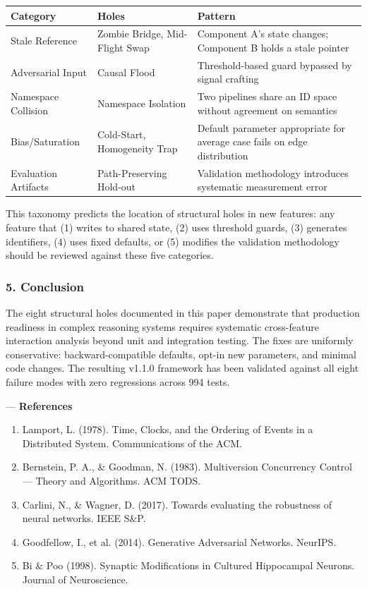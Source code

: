 \begin{center}
{\footnotesize
\begin{tabularx}{\columnwidth}{|>{\raggedright\arraybackslash}X|>{\raggedright\arraybackslash}X|>{\raggedright\arraybackslash}X|}
\hline
Category & Holes & Pattern \\ \hline
Stale Reference & Zombie Bridge, Mid-Flight Swap & Component A's state changes; Component B holds a stale pointer \\ \hline
Adversarial Input & Causal Flood & Threshold-based guard bypassed by signal crafting \\ \hline
Namespace Collision & Namespace Isolation & Two pipelines share an ID space without agreement on semantics \\ \hline
Bias/Saturation & Cold-Start, Homogeneity Trap & Default parameter appropriate for average case fails on edge distr\-ibution \\ \hline
Evaluation Artifacts & Path-Preserving Hold-out & Validation methodology introduces systematic measurement error \\ \hline
\end{tabularx}
}
\end{center}

This taxonomy predicts the location of structural holes in new features: any feature that (1) writes to shared state, (2) uses threshold guards, (3) generates identifiers, (4) uses fixed defaults, or (5) modifies the validation methodology should be reviewed against these five categories.

\subsubsection{5. Conclusion}
The eight structural holes documented in this paper demonstrate that production readiness in complex reasoning systems requires systematic cross-feature interaction analysis beyond unit and integration testing. The fixes are uniformly conse\-rvative: backward-compatible defaults, opt-in new parameters, and minimal code changes. The resulting v1.1.0 framework has been validated against all eight failure modes with zero regressions across 994 tests.

---
\textbf{References}
\begin{enumerate}
\item Lamport, L. (1978). Time, Clocks, and the Ordering of Events in a Distributed System. Commun\-ications of the ACM.
\item Bernstein, P. A., \& Goodman, N. (1983). Multiv\-ersion Concurrency Control — Theory and Algorithms. ACM TODS.
\item Carlini, N., \& Wagner, D. (2017). Towards evaluating the robustness of neural networks. IEEE S\&P.
\item Goodfellow, I., et al. (2014). Generative Adversarial Networks. NeurIPS.
\item Bi \& Poo (1998). Synaptic Modifi\-cations in Cultured Hippocampal Neurons. Journal of Neuros\-cience.

\end{enumerate}